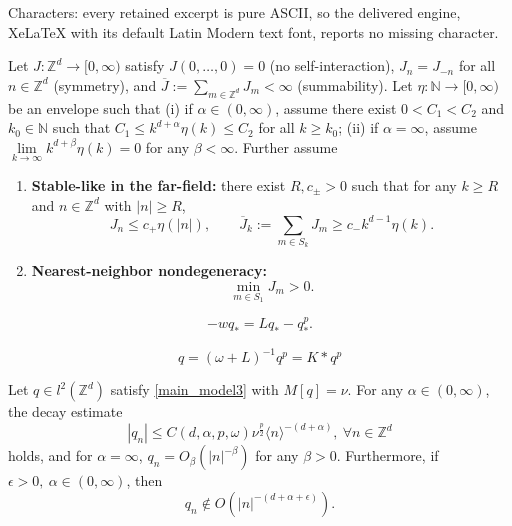 \documentclass[10pt,a4paper]{amsart}
\begin{document}
Characters: every retained excerpt is pure ASCII, so the delivered engine, XeLaTeX with its default Latin Modern text font, reports no missing character.
\begin{definition}\label{def:kernel}

Let $J:\mathbb{Z}^d \rightarrow [0,\infty)$ satisfy $J(0,\dots,0) = 0$ (no self-interaction), $J_{n} = J_{-n}$ for all $n \in \mathbb{Z}^d$ (symmetry), and $\overline{J} := \sum\limits_{m \in \mathbb{Z}^d} J_m < \infty$ (summability). Let $\eta:\mathbb{N} \rightarrow [0,\infty)$ be an envelope such that (i) if $\alpha \in (0,\infty)$, assume there exist $0< C_1 < C_2$ and $k_0 \in \mathbb{N}$ such that $C_1 \leq k^{d+\alpha} \eta(k) \leq C_2$ for all $k \geq k_{0}$; (ii) if $\alpha = \infty$, assume $\lim\limits_{k \rightarrow \infty} k^{d+\beta} \eta(k) = 0$ for any $\beta < \infty$. Further assume 
\begin{enumerate}
    \item[(I)] \textbf{Stable-like in the far-field:} there exist $R, c_{\pm} > 0$ such that for any $k \geq R$ and $n \in \mathbb{Z}^d$ with $|n| \geq R$, 
    \begin{equation*}
    J_n \leq c_{+} \eta(|n|),\qquad \overline{J}_k := \sum_{m \in S_k} J_m \geq c_{-} k^{d-1} \eta(k).    
    \end{equation*} 
    
    \item[(II)] \textbf{Nearest-neighbor nondegeneracy:}
    \begin{equation*}
        \min_{m \in S_1} J_m > 0.
    \end{equation*}    
\end{enumerate}
\end{definition}

    \begin{equation}\label{main_model3}
        -w q_* = L q_* - q_*^p.
    \end{equation}

\begin{equation}\label{ground_state}
    q = (\omega+L)^{-1}q^p = K \ast q^p
\end{equation}

\begin{proposition}\label{algebraic_decay}
Let $q \in l^2(\mathbb{Z}^d)$ satisfy \eqref{main_model3} with $M[q] = \nu$. For any $\alpha \in (0,\infty)$, the decay estimate 
\begin{equation}\label{decay2}
    |q_n| \leq C(d,\alpha,p,\omega) \nu^{\frac{p}{2}} \langle n \rangle^{-(d+\alpha)},\ \forall n \in \mathbb{Z}^d 
\end{equation}
holds, and for $\alpha = \infty$, $q_n = O_{\beta}(|n|^{-\beta})$ for any $\beta > 0$. Furthermore, if $\epsilon > 0,\ \alpha \in (0,\infty)$, then
\begin{equation}
q_n \notin O(|n|^{-(d+\alpha+\epsilon)}).    
\end{equation}
\end{proposition}
\end{document}
